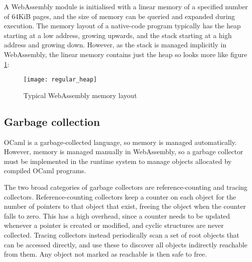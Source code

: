 
A WebAssembly module is initialised with a linear memory of a specified number of 64KiB pages, and the size of memory can be queried and expanded during execution.
The memory layout of a native-code program typically has the heap starting at a low address, growing upwards, and the stack starting at a high address and growing down. However, as the stack is managed implicitly in WebAssembly, the linear memory contains just the heap so looks more like figure \ref{fig:wasm-heap}:


\begin{figure}[H]
\texttt{[image: regular\_heap]}
\caption{Typical WebAssembly memory layout}
\label{fig:wasm-heap}
\end{figure}


\subsection{Garbage collection}
OCaml is a garbage-collected language, so memory is managed automatically. However, memory is managed manually in WebAssembly, so a garbage collector must be implemented in the runtime system to manage objects allocated by compiled OCaml programs.

The two broad categories of garbage collectors are reference-counting and tracing collectors. Reference-counting collectors keep a counter on each object for the number of pointers to that object that exist, freeing the object when the counter falls to zero. This has a high overhead, since a counter needs to be updated whenever a pointer is created or modified, and cyclic structures are never collected. Tracing collectors instead periodically scan a set of root objects that can be accessed directly, and use these to discover all objects indirectly reachable from them. Any object not marked as reachable is then safe to free. 

